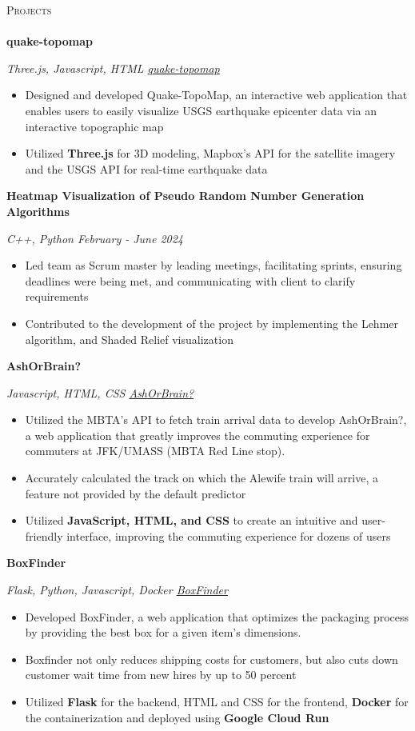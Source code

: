 \documentclass[a4paper]{article}
\newcommand{\lineunder} {
    \vspace*{-8pt} \\
    \hspace*{-18pt} \hrulefill \\
}
\newcommand{\header} [1] {
    {\hspace*{-18pt}\vspace*{6pt} \textsc{#1}}
    \vspace*{-6pt} \lineunder
}
\begin{document}
\header{Projects}
{\textbf{quake-topomap}} {\sl Three.js, Javascript, HTML \hfill \href{https://ahounain.github.io/quake-topomap/init/}{quake-topomap}\\
\begin{itemize} 
	\item Designed and developed Quake-TopoMap, an interactive web application that enables users to easily visualize USGS earthquake epicenter data via an interactive topographic map
	\item Utilized \textbf{Three.js} for 3D modeling, Mapbox's API for the satellite imagery and the USGS API for real-time earthquake data
\end{itemize}
\vspace*{2mm}

{\textbf{Heatmap Visualization of Pseudo Random Number Generation Algorithms}} {\sl C++, Python \hfill {February - June 2024 } \\
\begin{itemize}
	\item Led team as Scrum master by leading meetings, facilitating sprints, ensuring deadlines were being met, and communicating with client to clarify requirements
	\item Contributed to the development of the project by implementing the Lehmer algorithm, and Shaded Relief visualization

\end{itemize}
\vspace*{2mm}
{\textbf{AshOrBrain?}} {\sl Javascript, HTML, CSS \hfill \href{https://bit.ly/ashorbrain}{AshOrBrain?} \\
\begin{itemize}
	\item Utilized the MBTA's API to fetch train arrival data to develop AshOrBrain?, a web application that greatly improves the commuting experience for commuters at JFK/UMASS (MBTA Red Line stop).
	\item Accurately calculated the track on which the Alewife train will arrive, a feature not provided by the default predictor
	\item Utilized \textbf{JavaScript, HTML, and CSS} to create an intuitive and user-friendly interface, improving the commuting experience for dozens of users
	\end{itemize}
\vspace*{2mm}

{\textbf{BoxFinder}} {\sl Flask, Python, Javascript, Docker \hfill \href{bit.ly/boxfinder}{BoxFinder } \\
\begin{itemize}
	\item Developed BoxFinder, a web application that optimizes the packaging process by providing the best box for a given item's dimensions. 		
	\item Boxfinder not only reduces shipping costs for customers, but also cuts down customer wait time from new hires by up to 50 percent	
	\item	 Utilized {\textbf{Flask}} for the backend, HTML and CSS for the frontend,  {\textbf{Docker}} for the containerization and deployed using {\textbf{Google Cloud Run}}



\end{itemize}}}}}
\end{document}
